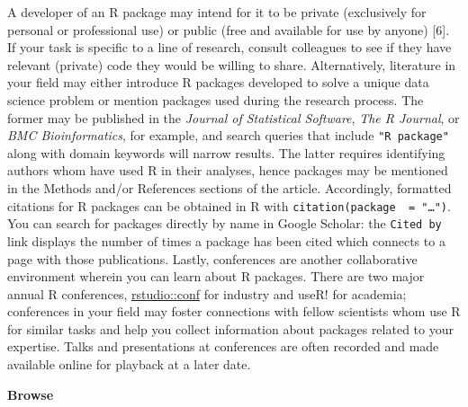 \documentclass[10pt,letterpaper]{article}
\begin{document}
A developer of an R package may intend for it to be private (exclusively
for personal or professional use) or public (free and available for use
by anyone) {[}6{]}. If your task is specific to a line of research,
consult colleagues to see if they have relevant (private) code they
would be willing to share. Alternatively, literature in your field may
either introduce R packages developed to solve a unique data science
problem or mention packages used during the research process. The former
may be published in the \emph{Journal of Statistical Software},
\emph{The R Journal}, or \emph{BMC Bioinformatics}, for example, and
search queries that include \texttt{"R\ package"} along with domain
keywords will narrow results. The latter requires identifying authors
whom have used R in their analyses, hence packages may be mentioned in
the Methods and/or References sections of the article. Accordingly,
formatted citations for R packages can be obtained in R with
\texttt{citation(package\ \ =\ "\ldots{}")}. You can search for packages
directly by name in Google Scholar: the \texttt{Cited\ by} link displays
the number of times a package has been cited which connects to a page
with those publications. Lastly, conferences are another collaborative
environment wherein you can learn about R packages. There are two major
annual R conferences,
\href{https://rstudio.com/conference/}{rstudio::conf} for industry and
useR! for academia; conferences in your field may foster connections
with fellow scientists whom use R for similar tasks and help you collect
information about packages related to your expertise. Talks and
presentations at conferences are often recorded and made available
online for playback at a later date.

\textbf{Browse}
\end{document}
